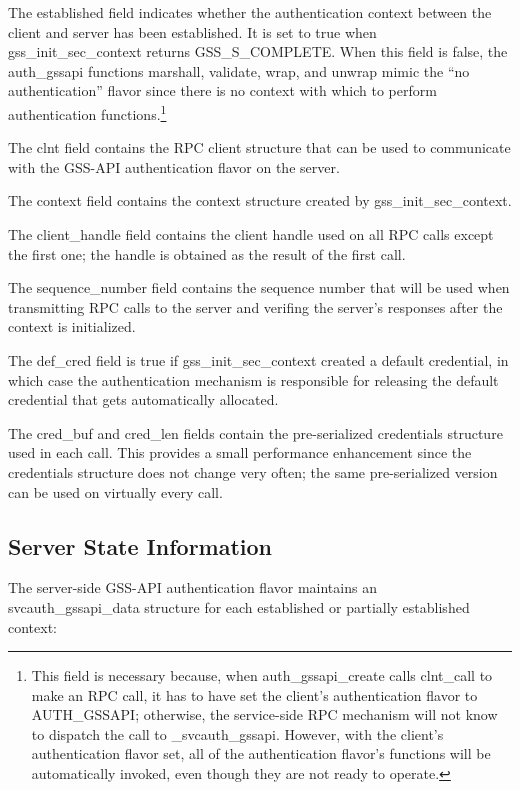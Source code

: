 The established field indicates whether the authentication context
between the client and server has been established.  It is set to true
when gss_init_sec_context returns GSS_S_COM\-PLETE.  When this field is
false, the auth_gssapi functions marshall, validate, wrap, and unwrap
mimic the ``no authentication'' flavor since there is no context with
which to perform authentication functions.\footnote{This field is
necessary because, when auth_gssapi_create calls clnt_call to make an
RPC call, it has to have set the client's authentication flavor to
AUTH_GSSAPI; otherwise, the service-side RPC mechanism will not know
to dispatch the call to _svcauth_gssapi.  However, with the client's
authentication flavor set, all of the authentication flavor's
functions will be automatically invoked, even though they are not
ready to operate.}

The clnt field contains the RPC client structure that can be used to
communicate with the GSS-API authentication flavor on the server.

The context field contains the context structure created by
gss_init_sec_context.

The client_handle field contains the client handle used on all RPC
calls except the first one; the handle is obtained as the result of
the first call.

The sequence_number field contains the sequence number that will be
used when transmitting RPC calls to the server and verifing the
server's responses after the context is initialized.

The def_cred field is true if gss_init_sec_context created a default
credential, in which case the authentication mechanism is responsible
for releasing the default credential that gets automatically
allocated.

The cred_buf and cred_len fields contain the pre-serialized
credentials structure used in each call.  This provides a small
performance enhancement since the credentials structure does not
change very often; the same pre-serialized version can be used on
virtually every call.

\subsection{Server State Information}
\label{sec:server-state}

The server-side GSS-API authentication flavor maintains an
svcauth_gssapi_data structure for each established or partially
established context:

